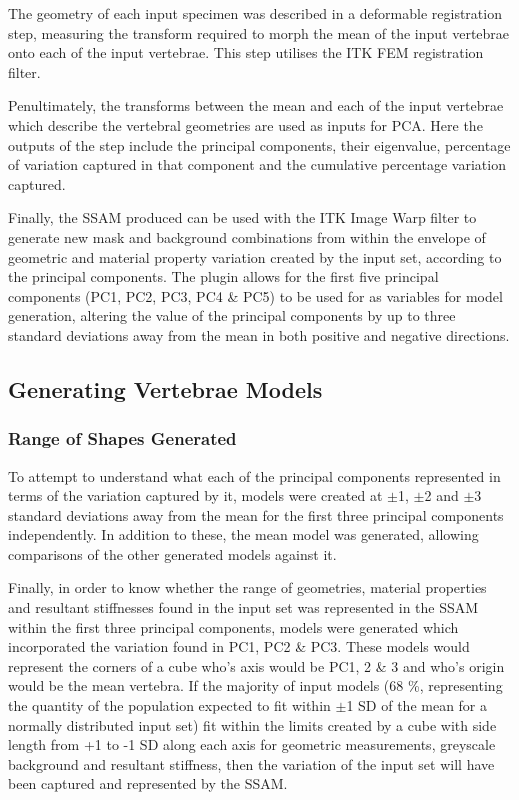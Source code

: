 The geometry of each input specimen was described in a deformable registration
step, measuring the transform required to morph the mean of the input vertebrae
onto each of the input vertebrae.  This step utilises the ITK FEM registration
filter.

Penultimately, the transforms between the mean and each of the input vertebrae
which describe the vertebral geometries are used as inputs for PCA.  Here the
outputs of the step include the principal components, their eigenvalue,
percentage of variation captured in that component and the cumulative
percentage variation captured.

Finally, the SSAM produced can be used with the ITK Image Warp filter to
generate new mask and background combinations from within the envelope of
geometric and material property variation created by the input set, according
to the principal components.  The plugin allows for the first five principal
components (PC1, PC2, PC3, PC4 \& PC5) to be used for as variables for model
generation, altering the value of the principal components by up to three
standard deviations away from the mean in both positive and negative
directions.

\subsection{Generating Vertebrae Models}

\subsubsection{Range of Shapes Generated}

To attempt to understand what each of the principal components represented in
terms of the variation captured by it, models were created at $\pm$1, $\pm$2
and $\pm$3 standard deviations away from the mean for the first three principal
components independently.  In addition to these, the mean model was generated,
allowing comparisons of the other generated models against it.

Finally, in order to know whether the range of geometries, material properties
and resultant stiffnesses found in the input set was represented in the SSAM
within the first three principal components, models were generated which
incorporated the variation found in PC1, PC2 \& PC3.  These models would
represent the corners of a cube who's axis would be PC1, 2 \& 3 and who's
origin would be the mean vertebra.  If the majority of input models (68 \%,
representing the quantity of the population expected to fit within $\pm$1 SD of
the mean for a normally distributed input set) fit within the limits created by
a cube with side length from +1 to -1 SD along each axis for geometric
measurements, greyscale background and resultant stiffness, then the variation
of the input set will have been captured and represented by the SSAM.

